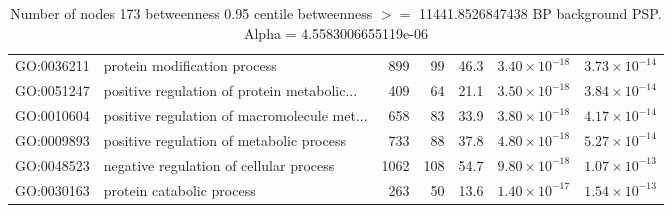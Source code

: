 \begin{table}[ht]
\begin{adjustbox}{max width=\textwidth}
\begin{tabular}{llrrrrr}
  GO:0036211 & protein modification process & 899 & 99 & 46.3 & $3.40 \times 10^{-18}$ & $3.73 \times 10^{-14}$ \\ 
  GO:0051247 & positive regulation of protein metabolic... & 409 & 64 & 21.1 & $3.50 \times 10^{-18}$ & $3.84 \times 10^{-14}$ \\ 
  GO:0010604 & positive regulation of macromolecule met... & 658 & 83 & 33.9 & $3.80 \times 10^{-18}$ & $4.17 \times 10^{-14}$ \\ 
  GO:0009893 & positive regulation of metabolic process & 733 & 88 & 37.8 & $4.80 \times 10^{-18}$ & $5.27 \times 10^{-14}$ \\ 
  GO:0048523 & negative regulation of cellular process & 1062 & 108 & 54.7 & $9.80 \times 10^{-18}$ & $1.07 \times 10^{-13}$ \\ 
  GO:0030163 & protein catabolic process & 263 & 50 & 13.6 & $1.40 \times 10^{-17}$ & $1.54 \times 10^{-13}$ \\ 
   \hline
\end{tabular}
\end{adjustbox}
\caption{Number of nodes 173 betweenness 0.95 centile  betweenness $>=$ 11441.8526847438 BP background PSP. Alpha = 4.5583006655119e-06} 
\label{tab:Number of nodes 173 betweenness 0.95 centile  betweenness $>=$ 11441.8526847438 BP background PSP. Alpha = 4.5583006655119e-06}
\end{table}



